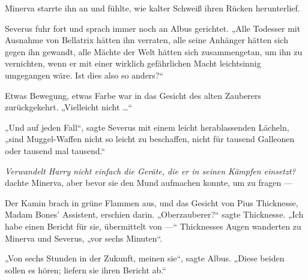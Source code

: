 Minerva starrte ihn an und fühlte, wie kalter Schweiß ihren Rücken herunterlief.

Severus fuhr fort und sprach immer noch an Albus gerichtet.
„Alle Todesser mit Ausnahme von Bellatrix hätten ihn verraten, alle seine Anhänger hätten sich gegen ihn gewandt, alle Mächte der Welt hätten sich zusammengetan, um ihn zu vernichten, wenn er mit einer wirklich gefährlichen Macht leichtsinnig umgegangen wäre. Ist dies also so anders?“

Etwas Bewegung, etwas Farbe war in das Gesicht des alten Zauberers zurückgekehrt.
„Vielleicht nicht …“

„Und auf jeden Fall“, sagte Severus mit einem leicht herablassenden Lächeln, „sind Muggel-Waffen nicht so leicht zu beschaffen, nicht für tausend Galleonen oder tausend mal tausend.“

\emph{Verwandelt Harry nicht einfach die Geräte, die er in seinen Kämpfen einsetzt?} dachte Minerva, aber bevor sie den Mund aufmachen konnte, um zu fragen —

Der Kamin brach in grüne Flammen aus, und das Gesicht von Pius Thicknesse, Madam Bones’ Assistent, erschien darin.
„Oberzauberer?“ sagte Thicknesse.
„Ich habe einen Bericht für sie, übermittelt von —“ Thicknesses Augen wanderten zu Minerva und Severus, „vor sechs Minuten“.

„Von sechs Stunden in der Zukunft, meinen sie“, sagte Albus.
„Diese beiden sollen es hören; liefern sie ihren Bericht ab.“

